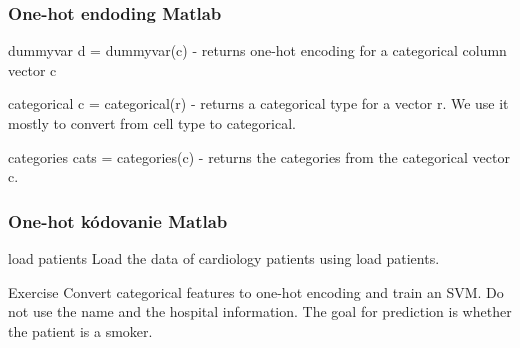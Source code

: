 \documentclass{beamer}
\begin{document}
\begin{frame}
\frametitle{One-hot endoding Matlab}
\begin{block}{dummyvar}
d = dummyvar(c) - returns one-hot encoding for a categorical column vector c
\end{block}

\begin{block}{categorical}
c = categorical(r) - returns a categorical type for a vector r. We use it mostly to convert from cell type to categorical.
\end{block}

\begin{block}{categories}
cats = categories(c) - returns the categories from the categorical vector c. 
\end{block}
\end{frame}

\begin{frame}
\frametitle{One-hot kódovanie Matlab}
\begin{block}{load patients}
Load the data of cardiology patients using load patients.
\end{block}

\begin{block}{Exercise}
Convert categorical features to one-hot encoding and train an SVM. Do not use the name and the hospital information. The goal for prediction is whether the patient is a smoker.
\end{block}
\end{frame}
\end{document}
